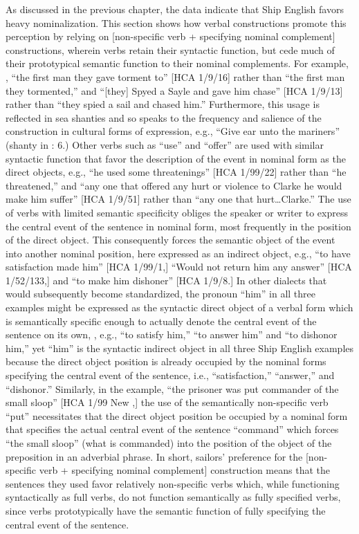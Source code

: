 As discussed in the previous chapter, the data indicate that Ship English favors heavy nominalization. This section shows how verbal constructions promote this perception by relying on [non-specific verb + specifying nominal complement] constructions, wherein verbs retain their syntactic function, but cede much of their prototypical semantic function to their nominal complements.  For example, , “the first man they gave torment to” [HCA 1/9/16] rather than “the first man they tormented,” and “[they] Spyed a Sayle and gave him chase” [HCA 1/9/13] rather than “they spied a sail and chased him.” Furthermore, this usage is reflected in sea shanties and so speaks to the frequency and salience of the construction in cultural forms of expression, e.g., “Give ear unto the mariners” (shanty in \citealt{Hugill1969}: 6.) Other verbs such as “use” and “offer” are used with similar syntactic function that favor the description of the event in nominal form as the direct objects, e.g., “he used some threatenings” [HCA 1/99/22] rather than “he threatened,” and “any one that offered any hurt or violence to Clarke he would make him suffer” [HCA 1/9/51] rather than “any one that hurt…Clarke.” The use of verbs with limited semantic specificity obliges the speaker or writer to express the central event of the sentence in nominal form, most frequently in the position of the direct object. This consequently forces the semantic object of the event into another nominal position, here expressed as an indirect object, e.g., “to have satisfaction made him” [HCA 1/99/1,] “Would not return him any answer” [HCA 1/52/133,] and “to make him dishoner” [HCA 1/9/8.] In other dialects that would subsequently become standardized, the pronoun “him” in all three examples might be expressed as the syntactic direct object of a verbal form which is semantically specific enough to actually denote the central event of the sentence on its own, , e.g., “to satisfy him,” “to answer him” and “to dishonor him,” yet  “him” is the syntactic indirect object in all three Ship English examples because the direct object position is already occupied by the nominal forms specifying the central event of the sentence, i.e., “satisfaction,” “answer,” and “dishonor.” Similarly, in the example, “the prisoner was put commander of the small sloop” [HCA 1/99 New \citealt{Providence1722},] the use of the semantically non-specific verb “put” necessitates that the direct object position be occupied by a nominal form that specifies the actual central event of the sentence “command” which forces “the small sloop” (what is commanded) into the position of the object of the preposition in an adverbial phrase. In short, sailors’ preference for the [non-specific verb + specifying nominal complement] construction means that the sentences they used favor relatively non-specific verbs which, while functioning syntactically as full verbs, do not function semantically as fully specified verbs, since verbs prototypically have the semantic function of fully specifying the central event of the sentence. 

